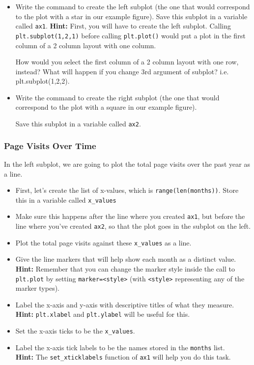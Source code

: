 \documentclass[a4paper]{article}
\begin{document}
\begin{itemize}
\item
Write the command to create the left subplot (the one that would correspond to the plot with a star in our example figure). Save this subplot in a variable called \texttt{ax1}. \newline
\textbf{Hint:} First, you will have to create the left subplot. Calling \texttt{plt.subplot(1,2,1)} before calling \texttt{plt.plot()} would put a plot in the first column of a 2 column layout with one column.

How would you select the first column of a 2 column layout with one row, instead? What will happen if you change 3rd argument of subplot? i.e. plt.subplot(1,2,2).

\item
Write the command to create the right subplot (the one that would correspond to the plot with a square in our example figure).

Save this subplot in a variable called \texttt{ax2}.
\end{itemize}

\subsubsection{Page Visits Over Time}
In the left subplot, we are going to plot the total page visits over the past year as a line.

\begin{itemize}
\item 
First, let’s create the list of x-values, which is \texttt{range(len(months))}. Store this in a variable called \texttt{x\_values}
    
\item
Make sure this happens after the line where you created \texttt{ax1}, but before the line where you’ve created \texttt{ax2}, so that the plot goes in the subplot on the left.
    
\item
Plot the total page visits against these \texttt{x\_values} as a line.

\item
Give the line markers that will help show each month as a distinct value. \\
\textbf{Hint:} Remember that you can change the marker style inside the call to \texttt{plt.plot} by setting \texttt{marker=<style>} (with \texttt{<style>} representing any of the marker types).

\item
Label the x-axis and y-axis with descriptive titles of what they measure. \\
\textbf{Hint:} \texttt{plt.xlabel} and \texttt{plt.ylabel} will be useful for this.

\item
Set the x-axis ticks to be the \texttt{x\_values}.

\item
Label the x-axis tick labels to be the names stored in the \texttt{months} list. \\
\textbf{Hint:} The \texttt{set\_xticklabels} function of \texttt{ax1} will help you do this task.
\end{itemize}{}
\end{document}
